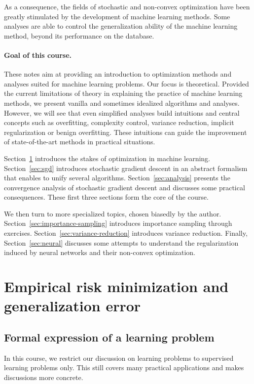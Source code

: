 \documentclass[11pt,reqno]{article}
\numberwithin{equation}{section}
\theoremstyle{plain}
\theoremstyle{definition}
\theoremstyle{remark}
\begin{document}
As a consequence, the fields of stochastic and non-convex optimization have been greatly stimulated by the development of machine learning methods. Some analyses are able to control the generalization ability of the machine learning method, beyond its performance on the database. 

\paragraph{Goal of this course.} These notes aim at providing an introduction to optimization methods and analyses suited for machine learning problems. Our focus is theoretical. Provided the current limitations of theory in explaining the practice of machine learning methods, we present vanilla and sometimes idealized algorithms and analyses. However, we will see that even simplified analyses build intuitions and central concepts such as overfitting, complexity control, variance reduction, implicit regularization or benign overfitting. These intuitions can guide the improvement of state-of-the-art methods in practical situations. 

Section~\ref{sec:empirical-risk} introduces the stakes of optimization in machine learning. Section~\ref{sec:sgd} introduces stochastic gradient descent in an abstract formalism that enables to unify several algorithms. Section~\ref{sec:analysis} presents the convergence analysis of stochastic gradient descent and discusses some practical consequences. These first three sections form the core of the course. 

We then turn to more specialized topics, chosen biasedly by the author. Section~\ref{sec:importance-sampling} introduces importance sampling through exercises. Section~\ref{sec:variance-reduction} introduces variance reduction. Finally, Section~\ref{sec:neural} discusses some attempts to understand the regularization induced by neural networks and their non-convex optimization. 

\section{Empirical risk minimization and generalization error}
\label{sec:empirical-risk}

\subsection{Formal expression of a learning problem}

In this course, we restrict our discussion on learning problems to supervised learning problems only. This still covers many practical applications and makes discussions more concrete. 
\end{document}
